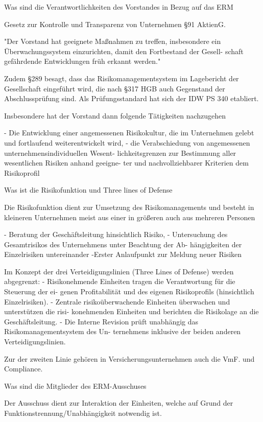 Was sind die Verantwortlichkeiten des Vorstandes in Bezug auf das ERM

Gesetz zur Kontrolle und Transparenz von Unternehmen §91 AktienG. 

"Der Vorstand hat geeignete Maßnahmen zu treffen, insbesondere ein
Überwachungssystem einzurichten, damit den Fortbestand der Gesell-
schaft gefährdende Entwicklungen früh erkannt werden."


Zudem §289 besagt, dass das Risikomanagementsystem im Lagebericht der Gesellschaft eingeführt wird, die nach §317 HGB auch Gegenstand der Abschlussprüfung sind.
Als Prüfungsstandard hat sich der IDW PS 340 etabliert.

Insbesondere hat der Vorstand dann folgende Tätigkeiten nachzugehen

- Die Entwicklung einer angemessenen Risikokultur, die im Unternehmen gelebt
und fortlaufend weiterentwickelt wird,
- die Verabschiedung von angemessenen unternehmensindividuellen Wesent-
lichkeitsgrenzen zur Bestimmung aller wesentlichen Risiken anhand geeigne-
ter und nachvollziehbarer Kriterien dem Risikoprofil


Was ist die Risikofunktion und Three lines of Defense 

Die Risikofunktion dient zur Umsetzung des Risikomanagements und besteht in kleineren Unternehmen meist aus einer in größeren auch aus mehreren Personen

- Beratung der Geschäftsleitung hinsichtlich Risiko,
- Untersuchung des Gesamtrisikos des Unternehmens unter Beachtung der Ab-
hängigkeiten der Einzelrisiken untereinander
-Erster Anlaufpunkt zur Meldung neuer Risiken 


Im Konzept der drei Verteidigungslinien (Three Lines of Defense) werden abgegrenzt:
- Risikonehmende Einheiten tragen die Verantwortung für die Steuerung der ei-
genen Profitabilität und des eigenen Risikoprofils (hinsichtlich Einzelrisiken).
- Zentrale risikoüberwachende Einheiten überwachen und unterstützen die risi-
konehmenden Einheiten und berichten die Risikolage an die Geschäftsleitung.
- Die Interne Revision prüft unabhängig das Risikomanagementsystem des Un-
ternehmens inklusive der beiden anderen Verteidigungslinien.


Zur der zweiten Linie gehören in Versicherungsunternehmen auch die VmF. und Compliance.


Was sind die Mitglieder des ERM-Ausschuses

Der Ausschuss dient zur Interaktion der Einheiten, welche auf Grund der Funktionstrennung/Unabhängigkeit notwendig ist.

